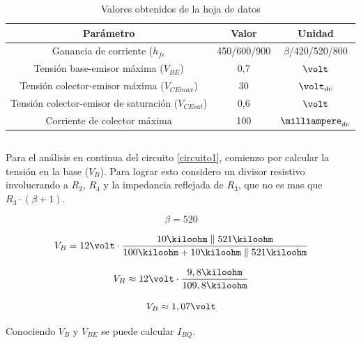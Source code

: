 \documentclass[12pt,letterpaper]{article}     %
\begin{document}
\begin{table}[!ht]
	\begin{center}
		\begin{tabular}{| c | c | c |}
			\hline
			\textbf{Parámetro} & \textbf{Valor} & \textbf{Unidad}\\ 
			\hline
			{Ganancia de corriente ($h_{fe}$} & {450/600/900} & {$\beta$/420/520/800}\\
			\hline
			{Tensión base-emisor máxima ($V_{BE}$)} & {0,7} & {$\volt$}\\
			\hline
			{Tensión colector-emisor máxima ($V_{CEmax}$)} & {30} & {${\volt}_{dc}$}\\
			\hline
			{Tensión colector-emisor de saturación ($V_{CEsat}$)} & {0,6} & {$\volt$}\\
			\hline
			{Corriente de colector máxima} & {100} & {${\milliampere}_{dc}$}\\
			\hline
		\end{tabular}
	\end{center}
\caption{Valores obtenidos de la hoja de datos}
\label{tab:tabla1}
\end{table}

\subsection{}

Para el análisis en continua del circuito \ref{circuito1}, comienzo por
calcular la tensión en la base ($V_B$).
Para lograr esto considero un divisor resistivo involucrando a $R_2$, $R_4$
y la impedancia reflejada de $R_3$, que no es mas que $R_3\cdot(\beta+1)$.

\begin{equation}
	\beta=520
\end{equation}

\begin{equation}
	V_B=
	12\volt\cdot\frac{
		10\kiloohm\parallel521\kiloohm
	}{
		100\kiloohm+10\kiloohm\parallel521\kiloohm
	}
\end{equation}

\begin{equation}
	V_B\approx
	12\volt\cdot\frac{
		9,8\kiloohm
	}{
		109,8\kiloohm
	}
\end{equation}

\begin{equation}
	V_B\approx
	1,07\volt
\end{equation}

Conociendo $V_B$ y $V_{BE}$ se puede calcular $I_{BQ}$.
\end{document}
